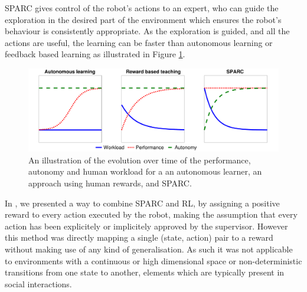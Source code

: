 \documentclass[letterpaper]{article} %
\begin{document}
SPARC gives control of the robot's actions to an expert, who can guide the
exploration in the desired part of the environment which ensures the robot's
behaviour is consistently appropriate. As the exploration is
guided, and all the actions are useful, the learning can be faster than
autonomous learning or feedback based learning as illustrated in Figure
\ref{fig:comparison}.

\begin{figure}
    \centering
    \includegraphics[width=0.9\linewidth]{./figs/motivation.pdf}
    \caption{An illustration of the evolution over time of the performance, autonomy and human workload for a
    an autonomous learner, an approach using human rewards, and SPARC.}
    \label{fig:comparison}
\end{figure}


In \cite{senft2017supervised}, we presented a way to combine SPARC and RL, by
assigning a positive reward to every action executed by the robot, making the assumption that every action has been explicitely or implicitely approved by the supervisor. However this method
was  directly mapping a single (state, action) pair to a reward without making
use of any kind of generalisation. As such it was not applicable to
environments with a continuous or high dimensional space or non-deterministic
transitions from one state to another, elements which are typically present in social interactions.
\end{document}
